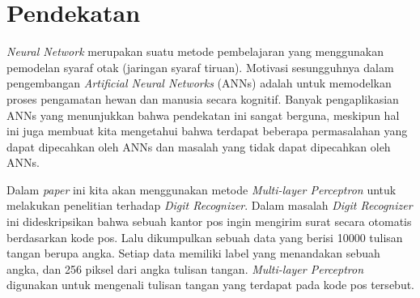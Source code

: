 \graphicspath{ {images/} }
\section{Pendekatan}
	\textit{Neural Network} merupakan suatu metode pembelajaran yang menggunakan pemodelan syaraf otak (jaringan syaraf tiruan). Motivasi sesungguhnya dalam pengembangan \textit{Artificial Neural Networks} (ANNs) adalah untuk memodelkan proses pengamatan hewan dan manusia secara kognitif. Banyak pengaplikasian ANNs yang menunjukkan bahwa pendekatan ini sangat berguna, meskipun hal ini juga membuat kita mengetahui bahwa terdapat beberapa permasalahan yang dapat dipecahkan oleh ANNs dan masalah yang tidak dapat dipecahkan oleh ANNs.
	\par Dalam \textit{paper} ini kita akan menggunakan metode \textit{Multi-layer Perceptron} untuk melakukan penelitian terhadap \textit{Digit Recognizer}. Dalam masalah \textit{Digit Recognizer} ini dideskripsikan bahwa sebuah kantor pos ingin mengirim surat secara otomatis berdasarkan kode pos. Lalu dikumpulkan sebuah data yang berisi 10000 tulisan tangan berupa angka. Setiap data memiliki label yang menandakan sebuah angka, dan 256 piksel dari angka tulisan tangan. \textit{Multi-layer Perceptron} digunakan untuk mengenali tulisan tangan yang terdapat pada kode pos tersebut.
	
